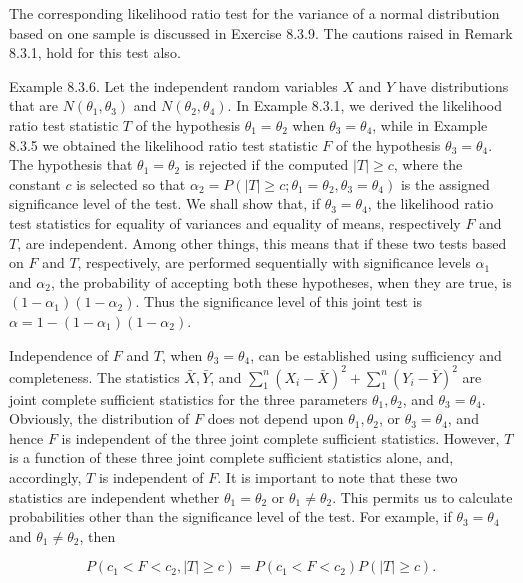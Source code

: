 The corresponding likelihood ratio test for the variance of a normal distribution based on one sample is discussed in Exercise 8.3.9. The cautions raised in Remark 8.3.1, hold for this test also.

Example 8.3.6. Let the independent random variables $X$ and $Y$ have distributions that are $N\left(\theta_{1}, \theta_{3}\right)$ and $N\left(\theta_{2}, \theta_{4}\right)$. In Example 8.3.1, we derived the likelihood ratio test statistic $T$ of the hypothesis $\theta_{1}=\theta_{2}$ when $\theta_{3}=\theta_{4}$, while in Example 8.3.5 we obtained the likelihood ratio test statistic $F$ of the hypothesis $\theta_{3}=\theta_{4}$. The hypothesis that $\theta_{1}=\theta_{2}$ is rejected if the computed $|T| \geq c$, where the constant $c$ is selected so that $\alpha_{2}=P\left(|T| \geq c ; \theta_{1}=\theta_{2}, \theta_{3}=\theta_{4}\right)$ is the assigned significance level of the test. We shall show that, if $\theta_{3}=\theta_{4}$, the likelihood ratio test statistics for equality of variances and equality of means, respectively $F$ and $T$, are independent. Among other things, this means that if these two tests based on $F$ and $T$, respectively, are performed sequentially with significance levels $\alpha_{1}$ and $\alpha_{2}$, the probability of accepting both these hypotheses, when they are true, is $\left(1-\alpha_{1}\right)\left(1-\alpha_{2}\right)$. Thus the significance level of this joint test is $\alpha=1-\left(1-\alpha_{1}\right)\left(1-\alpha_{2}\right)$.

Independence of $F$ and $T$, when $\theta_{3}=\theta_{4}$, can be established using sufficiency and completeness. The statistics $\bar{X}, \bar{Y}$, and $\sum_{1}^{n}\left(X_{i}-\bar{X}\right)^{2}+\sum_{1}^{n}\left(Y_{i}-\bar{Y}\right)^{2}$ are joint complete sufficient statistics for the three parameters $\theta_{1}, \theta_{2}$, and $\theta_{3}=\theta_{4}$. Obviously, the distribution of $F$ does not depend upon $\theta_{1}, \theta_{2}$, or $\theta_{3}=\theta_{4}$, and hence $F$ is independent of the three joint complete sufficient statistics. However, $T$ is a function of these three joint complete sufficient statistics alone, and, accordingly, $T$ is independent of $F$. It is important to note that these two statistics are independent whether $\theta_{1}=\theta_{2}$ or $\theta_{1} \neq \theta_{2}$. This permits us to calculate probabilities other than the significance level of the test. For example, if $\theta_{3}=\theta_{4}$ and $\theta_{1} \neq \theta_{2}$, then

$$
P\left(c_{1}<F<c_{2},|T| \geq c\right)=P\left(c_{1}<F<c_{2}\right) P(|T| \geq c) .
$$


